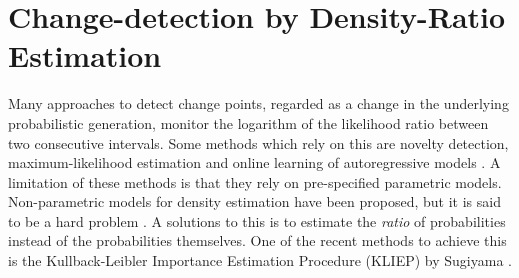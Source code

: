 \section{Change-detection by Density-Ratio Estimation}\label{density-ratio}









Many approaches to detect change points, regarded as a change in the underlying probabilistic generation, monitor the logarithm of the likelihood ratio between two consecutive intervals.
Some methods which rely on this are novelty detection, maximum-likelihood estimation and online learning of autoregressive models \cite{kawahara2009change}.
A limitation of these methods is that they rely on pre-specified parametric models.
Non-parametric models for density estimation have been proposed, but it is said to be a hard problem \cite{hardle2004nonparametric, sugiyama2012density}.
A solutions to this is to estimate the \emph{ratio} of probabilities instead of the probabilities themselves.
One of the recent methods to achieve this is the Kullback-Leibler Importance Estimation Procedure (KLIEP) by Sugiyama \etal \cite{sugiyama2008direct}.

